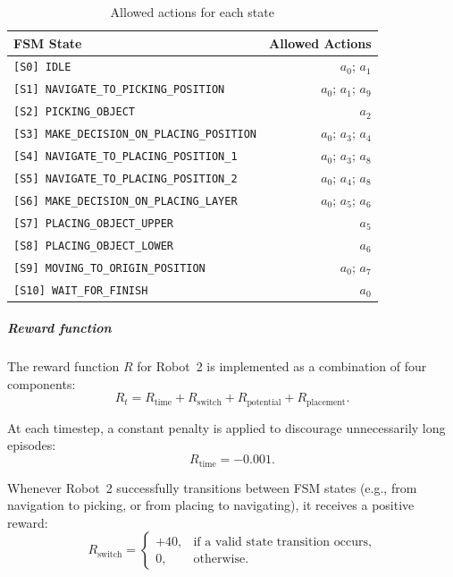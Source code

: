 \documentclass[english, 12pt, a4paper, elec, utf8, a-2b, online]{aaltothesis}
\begin{document}
\begin{table}[H]
\centering
\caption{Allowed actions for each state}
\label{tab:allowed_actions_symbols}
\begin{tabular}{|l|r|}
\hline
\textbf{FSM State} & \textbf{Allowed Actions} \\ \hline
\texttt{[S0] IDLE} & $a_0$; $a_1$ \\ \hline
\texttt{[S1] NAVIGATE\_TO\_PICKING\_POSITION} & $a_0$; $a_1$; $a_9$ \\ \hline
\texttt{[S2] PICKING\_OBJECT} & $a_2$ \\ \hline
\texttt{[S3] MAKE\_DECISION\_ON\_PLACING\_POSITION} & $a_0$; $a_3$; $a_4$ \\ \hline
\texttt{[S4] NAVIGATE\_TO\_PLACING\_POSITION\_1} & $a_0$; $a_3$; $a_8$ \\ \hline
\texttt{[S5] NAVIGATE\_TO\_PLACING\_POSITION\_2} & $a_0$; $a_4$; $a_8$ \\ \hline
\texttt{[S6] MAKE\_DECISION\_ON\_PLACING\_LAYER} & $a_0$; $a_5$; $a_6$ \\ \hline
\texttt{[S7] PLACING\_OBJECT\_UPPER} & $a_5$ \\ \hline
\texttt{[S8] PLACING\_OBJECT\_LOWER} & $a_6$ \\ \hline
\texttt{[S9] MOVING\_TO\_ORIGIN\_POSITION} & $a_0$; $a_7$ \\ \hline
\texttt{[S10] WAIT\_FOR\_FINISH} & $a_0$ \\ \hline
\end{tabular}
\end{table}

\subparagraph{Reward function}

The reward function $R$ for Robot~2 is implemented as a combination of four components:
\begin{equation}
R_t = R_\text{time} + R_\text{switch} + R_\text{potential} + R_\text{placement}.
\end{equation}

At each timestep, a constant penalty is applied to discourage unnecessarily long episodes:
\begin{equation}
R_\text{time} = -0.001.
\end{equation}

Whenever Robot~2 successfully transitions between FSM states (e.g., from navigation to picking, or from placing to navigating), it receives a positive reward:
\begin{equation}
R_\text{switch} =
\begin{cases}
+40, & \text{if a valid state transition occurs}, \\
0,   & \text{otherwise}.
\end{cases}
\end{equation}
\end{document}
